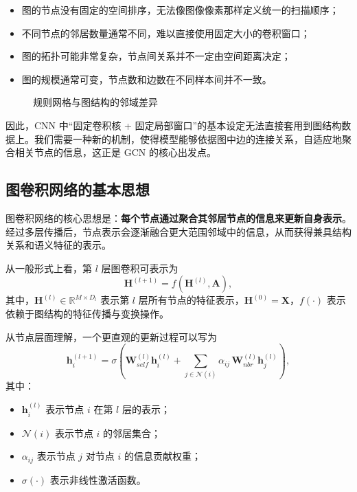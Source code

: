 \begin{itemize}
    \item 图的节点没有固定的空间排序，无法像图像像素那样定义统一的扫描顺序；
    \item 不同节点的邻居数量通常不同，难以直接使用固定大小的卷积窗口；
    \item 图的拓扑可能非常复杂，节点间关系并不一定由空间距离决定；
    \item 图的规模通常可变，节点数和边数在不同样本间并不一致。
\end{itemize}

\begin{figure}[H]
  \centering
  
  \caption{规则网格与图结构的邻域差异}
  \label{fig:ch09_orig19}
\end{figure}

因此，CNN 中“固定卷积核 + 固定局部窗口”的基本设定无法直接套用到图结构数据上。我们需要一种新的机制，使得模型能够依据图中边的连接关系，自适应地聚合相关节点的信息，这正是 GCN 的核心出发点。

\subsection{图卷积网络的基本思想}

图卷积网络的核心思想是：\textbf{每个节点通过聚合其邻居节点的信息来更新自身表示}。经过多层传播后，节点表示会逐渐融合更大范围邻域中的信息，从而获得兼具结构关系和语义特征的表示。

从一般形式上看，第 $l$ 层图卷积可表示为
\begin{equation}
    \mathbf{H}^{(l+1)} = f\!\left(\mathbf{H}^{(l)}, \mathbf{A}\right),
\end{equation}
其中，$\mathbf{H}^{(l)} \in \mathbb{R}^{M \times D_l}$ 表示第 $l$ 层所有节点的特征表示，$\mathbf{H}^{(0)} = \mathbf{X}$，$f(\cdot)$ 表示依赖于图结构的特征传播与变换操作。

从节点层面理解，一个更直观的更新过程可以写为
\begin{equation}
    \mathbf{h}_i^{(l+1)}=
    \sigma\!\left(
    \mathbf{W}_{self}^{(l)} \mathbf{h}_i^{(l)}
    +
    \sum_{j\in\mathcal{N}(i)}
    \alpha_{ij}\,
    \mathbf{W}_{nbr}^{(l)} \mathbf{h}_j^{(l)}
    \right),
\end{equation}
其中：
\begin{itemize}
    \item $\mathbf{h}_i^{(l)}$ 表示节点 $i$ 在第 $l$ 层的表示；
    \item $\mathcal{N}(i)$ 表示节点 $i$ 的邻居集合；
    \item $\alpha_{ij}$ 表示节点 $j$ 对节点 $i$ 的信息贡献权重；
    \item $\sigma(\cdot)$ 表示非线性激活函数。
\end{itemize}

